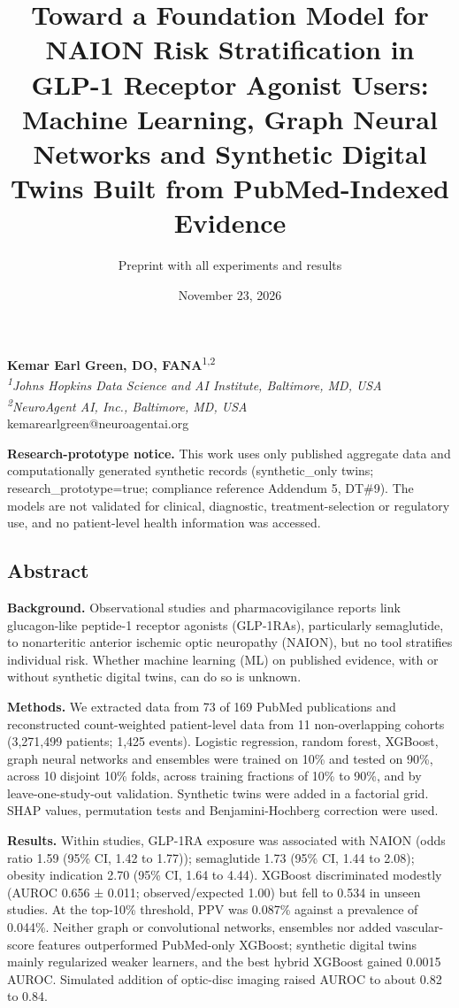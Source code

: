 \documentclass[
  11pt,
]{article}
\title{Toward a Foundation Model for NAION Risk Stratification in GLP-1
Receptor Agonist Users: Machine Learning, Graph Neural Networks and
Synthetic Digital Twins Built from PubMed-Indexed Evidence}
\subtitle{Preprint with all experiments and results}
\author{}
\date{November 23, 2026}
\begin{document}
\maketitle

\textbf{Kemar Earl Green, DO, FANA}\textsuperscript{1,2}\\
\emph{\textsuperscript{1}Johns Hopkins Data Science and AI Institute,
Baltimore, MD, USA}\\
\emph{\textsuperscript{2}NeuroAgent AI, Inc., Baltimore, MD, USA}\\
kemarearlgreen@neuroagentai.org

\textbf{Research-prototype notice.} This work uses only published
aggregate data and computationally generated synthetic records
(synthetic\_only twins; research\_prototype=true; compliance reference
Addendum 5, DT\#9). The models are not validated for clinical,
diagnostic, treatment-selection or regulatory use, and no patient-level
health information was accessed.

\subsection{Abstract}\label{abstract}

\textbf{Background.} Observational studies and pharmacovigilance reports
link glucagon-like peptide-1 receptor agonists (GLP-1RAs), particularly
semaglutide, to nonarteritic anterior ischemic optic neuropathy (NAION),
but no tool stratifies individual risk. Whether machine learning (ML) on
published evidence, with or without synthetic digital twins, can do so
is unknown.

\textbf{Methods.} We extracted data from 73 of 169 PubMed publications
and reconstructed count-weighted patient-level data from 11
non-overlapping cohorts (3,271,499 patients; 1,425 events). Logistic
regression, random forest, XGBoost, graph neural networks and ensembles
were trained on 10\% and tested on 90\%, across 10 disjoint 10\% folds,
across training fractions of 10\% to 90\%, and by leave-one-study-out
validation. Synthetic twins were added in a factorial grid. SHAP values,
permutation tests and Benjamini-Hochberg correction were used.

\textbf{Results.} Within studies, GLP-1RA exposure was associated with
NAION (odds ratio 1.59 (95\% CI, 1.42 to 1.77)); semaglutide 1.73 (95\%
CI, 1.44 to 2.08); obesity indication 2.70 (95\% CI, 1.64 to 4.44).
XGBoost discriminated modestly (AUROC 0.656 ± 0.011; observed/expected
1.00) but fell to 0.534 in unseen studies. At the top-10\% threshold,
PPV was 0.087\% against a prevalence of 0.044\%. Neither graph or
convolutional networks, ensembles nor added vascular-score features
outperformed PubMed-only XGBoost; synthetic digital twins mainly
regularized weaker learners, and the best hybrid XGBoost gained 0.0015
AUROC. Simulated addition of optic-disc imaging raised AUROC to about
0.82 to 0.84.
\end{document}
